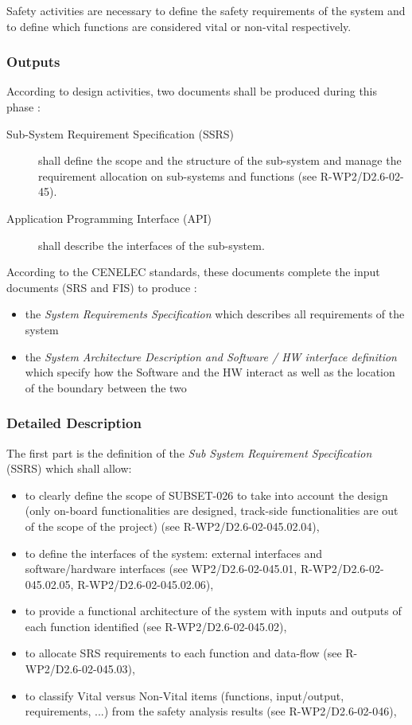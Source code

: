 Safety activities are necessary to define the safety requirements of the system and to define which functions are considered vital or non-vital respectively.

\subsubsection{Outputs}
\label{sec:sys-ana-outputs}

According to  design activities, two documents shall be produced during this phase :

\begin{description}
\item[Sub-System Requirement Specification (SSRS)] shall define the scope and the structure of the sub-system and  manage the requirement allocation on sub-systems and functions (see R-WP2/D2.6-02-45).
\item[Application Programming Interface (API)] shall describe the interfaces of the sub-system.
\end{description}


According to the CENELEC standards, these documents complete the input documents (SRS and FIS) to produce :
\begin{itemize}
\item the \emph{System  Requirements Specification} which describes all requirements of the system
\item the \emph{System Architecture Description
and Software / HW interface definition } which specify how the Software and the HW interact
as well as the location of the boundary between the two
\end{itemize}

\subsubsection{Detailed Description}
\label{sec:sys-ana-descr}

The first part is the definition of the  \emph{Sub System Requirement Specification} (SSRS) which shall allow:
\begin{itemize}
\item to clearly define the scope of SUBSET-026 to take into account the design (only on-board functionalities are designed, track-side functionalities are out of the scope of the project) (see R-WP2/D2.6-02-045.02.04),
\item to define the interfaces of the system: external interfaces and software/hardware interfaces (see WP2/D2.6-02-045.01, R-WP2/D2.6-02-045.02.05, R-WP2/D2.6-02-045.02.06),
\item to provide a functional architecture of the system with inputs and outputs of each function identified (see R-WP2/D2.6-02-045.02),
\item to allocate SRS requirements to each function and data-flow (see R-WP2/D2.6-02-045.03),
\item to classify Vital versus Non-Vital items (functions, input/output, requirements, ...) from the safety analysis results (see R-WP2/D2.6-02-046),
\end{itemize}

